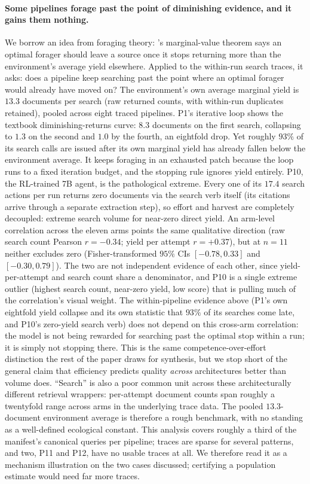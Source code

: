 \documentclass[11pt]{article}
\begin{document}
\paragraph{Some pipelines forage past the point of diminishing evidence, and it gains them nothing.}
We borrow an idea from foraging theory: \citet{charnov1976marginal}'s marginal-value theorem
says an optimal forager should leave a source once it stops returning more than the
environment's average yield elsewhere. Applied to the within-run search traces, it asks:
does a pipeline keep searching past the point where an optimal
forager would already have moved on? The environment's own
average marginal yield is $13.3$
documents per search (raw returned counts, with within-run duplicates retained), pooled across eight traced pipelines. P1's iterative loop shows the textbook diminishing-returns curve:
$8.3$ documents on the first search, collapsing to $1.3$ on the second and $1.0$ by the fourth, an
eightfold drop. Yet roughly $93\%$ of its search calls are issued after its own marginal yield has
already fallen below the environment average. It keeps foraging in an exhausted patch because the
loop runs to a fixed iteration budget, and the stopping rule ignores yield entirely. P10, the
RL-trained 7B agent, is the
pathological extreme. Every one of its $17.4$
search actions per run returns zero documents via the search
verb itself (its citations arrive through a separate extraction step), so effort and harvest are
completely decoupled: extreme search volume for near-zero direct yield. An arm-level correlation
across the eleven arms points the same qualitative direction (raw search count Pearson
$r=-0.34$; yield per attempt $r=+0.37$), but at $n=11$ neither excludes zero (Fisher-transformed
$95\%$ CIs $[-0.78, 0.33]$ and $[-0.30, 0.79]$). The two are not independent evidence of each
other, since yield-per-attempt and search count share a denominator, and P10 is a single extreme
outlier (highest search count, near-zero yield, low score) that is pulling much of
the correlation's visual weight. The within-pipeline
evidence above (P1's own eightfold yield collapse and its own statistic that $93\%$ of its
searches come late, and
P10's zero-yield search verb) does not depend on this cross-arm correlation:
the model is not being rewarded for searching past the optimal stop
within a run; it is simply not stopping there. This is the same competence-over-effort
distinction the rest of the paper draws for synthesis, but we stop short of the general claim that efficiency
predicts quality \emph{across} architectures better than volume does. ``Search'' is also a poor
common unit across these architecturally different retrieval wrappers: per-attempt document
counts span roughly a twentyfold range across arms in the underlying trace data. The pooled
$13.3$-document environment average is therefore a rough benchmark, with no standing as
a well-defined ecological constant. This analysis covers roughly a third of the manifest's canonical queries per
pipeline; traces are sparse for several patterns, and two, P11 and P12, have no usable traces at
all. We therefore read it as a mechanism illustration on the two cases discussed; certifying a
population estimate would need far more traces.
\end{document}

